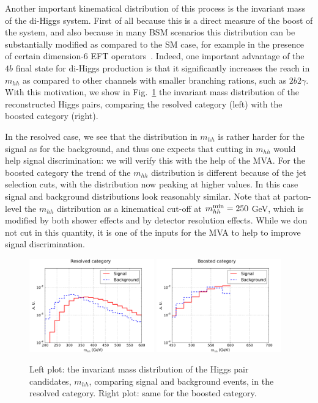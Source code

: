 Another important kinematical distribution of this process is the invariant mass
of the di-Higgs system.
%
First of all because this is a direct measure of the boost of the system,
and also because in many BSM scenarios this distribution can be substantially
modified as compared to the SM case, for example in the presence
of certain dimension-6 EFT operators~\cite{Azatov:2015oxa}.
%
Indeed, one important advantage of the $4b$ final state for
di-Higgs production is that it significantly increases the reach
in $m_{hh}$ as compared to other channels with smaller branching rations,
such as $2b2\gamma$.
%
With this motivation, we show in
Fig.~\ref{fig:mhh} the invariant mass distribution of the
reconstructed Higgs pairs,
comparing the resolved category (left) with the boosted category (right).


In the resolved case, we see that the distribution
in $m_{hh}$ is rather harder for the signal as for the background,
and thus one expects that cutting in $m_{hh}$ would help signal
discrimination: we will verify this with the help of the MVA.
%
For the boosted category the trend of the $m_{hh}$ distribution
is different because of the jet selection cuts, with the
distribution now peaking at higher values.
%
In this case signal and background distributions
look reasonably similar.
%
Note that at parton-level the $m_{hh}$ distribution as a kinematical
cut-off at $m_{hh}^{\rm min}=250$ GeV, which is modified by both
shower effects and by detector resolution effects.
%
While we don not cut in this quantity, it is
one of the inputs for the MVA to help to improve signal discrimination.

\begin{figure}[t]
\begin{center}
  \includegraphics[width=0.48\textwidth]{plots/m_HH_res_C1.pdf}
  \includegraphics[width=0.48\textwidth]{plots/m_HH_boost_C1.pdf}
  \caption{\small Left plot: the invariant mass distribution of the Higgs
    pair candidates, $m_{hh}$, comparing signal and background events,
    in the resolved category.
    Right plot: same for the boosted category.
}
\label{fig:mhh}
\end{center}
\end{figure}


